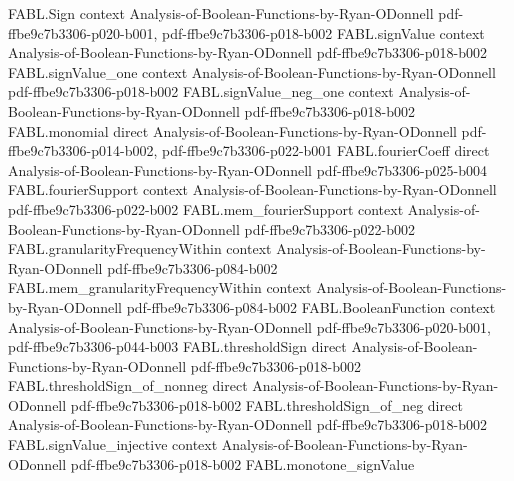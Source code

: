 \begin{theorem}
\label{FABL.IsMajorityFunction.monotone}
\leanok
{}
\proofstep
  {FABL.Sign}
  {context}
  {Analysis-of-Boolean-Functions-by-Ryan-ODonnell}
  {pdf-ffbe9c7b3306-p020-b001,
    pdf-ffbe9c7b3306-p018-b002}
\proofstep
  {FABL.signValue}
  {context}
  {Analysis-of-Boolean-Functions-by-Ryan-ODonnell}
  {pdf-ffbe9c7b3306-p018-b002}
\proofstep
  {FABL.signValue_one}
  {context}
  {Analysis-of-Boolean-Functions-by-Ryan-ODonnell}
  {pdf-ffbe9c7b3306-p018-b002}
\proofstep
  {FABL.signValue_neg_one}
  {context}
  {Analysis-of-Boolean-Functions-by-Ryan-ODonnell}
  {pdf-ffbe9c7b3306-p018-b002}
\proofstep
  {FABL.monomial}
  {direct}
  {Analysis-of-Boolean-Functions-by-Ryan-ODonnell}
  {pdf-ffbe9c7b3306-p014-b002,
    pdf-ffbe9c7b3306-p022-b001}
\proofstep
  {FABL.fourierCoeff}
  {direct}
  {Analysis-of-Boolean-Functions-by-Ryan-ODonnell}
  {pdf-ffbe9c7b3306-p025-b004}
\proofstep
  {FABL.fourierSupport}
  {context}
  {Analysis-of-Boolean-Functions-by-Ryan-ODonnell}
  {pdf-ffbe9c7b3306-p022-b002}
\proofstep
  {FABL.mem_fourierSupport}
  {context}
  {Analysis-of-Boolean-Functions-by-Ryan-ODonnell}
  {pdf-ffbe9c7b3306-p022-b002}
\proofstep
  {FABL.granularityFrequencyWithin}
  {context}
  {Analysis-of-Boolean-Functions-by-Ryan-ODonnell}
  {pdf-ffbe9c7b3306-p084-b002}
\proofstep
  {FABL.mem_granularityFrequencyWithin}
  {context}
  {Analysis-of-Boolean-Functions-by-Ryan-ODonnell}
  {pdf-ffbe9c7b3306-p084-b002}
\proofstep
  {FABL.BooleanFunction}
  {context}
  {Analysis-of-Boolean-Functions-by-Ryan-ODonnell}
  {pdf-ffbe9c7b3306-p020-b001,
    pdf-ffbe9c7b3306-p044-b003}
\proofstep
  {FABL.thresholdSign}
  {direct}
  {Analysis-of-Boolean-Functions-by-Ryan-ODonnell}
  {pdf-ffbe9c7b3306-p018-b002}
\proofstep
  {FABL.thresholdSign_of_nonneg}
  {direct}
  {Analysis-of-Boolean-Functions-by-Ryan-ODonnell}
  {pdf-ffbe9c7b3306-p018-b002}
\proofstep
  {FABL.thresholdSign_of_neg}
  {direct}
  {Analysis-of-Boolean-Functions-by-Ryan-ODonnell}
  {pdf-ffbe9c7b3306-p018-b002}
\proofstep
  {FABL.signValue_injective}
  {context}
  {Analysis-of-Boolean-Functions-by-Ryan-ODonnell}
  {pdf-ffbe9c7b3306-p018-b002}
\proofstep
  {FABL.monotone_signValue}

\end{theorem}
